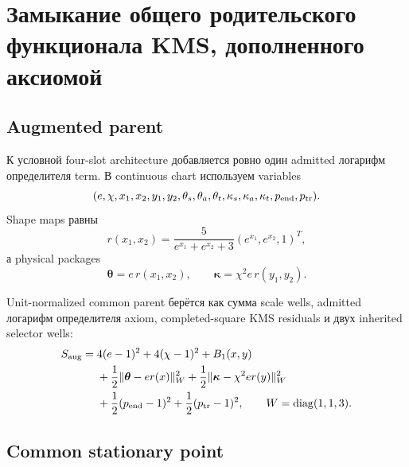 \chapter{Замыкание общего родительского функционала KMS, дополненного аксиомой}
\label{ch:v9-kms-axiom-common-closure}

\section{Augmented parent}

К условной four-slot architecture добавляется ровно один admitted логарифм определителя
term. В continuous chart используем variables
\begin{equation}
 (e,\chi,x_1,x_2,y_1,y_2,\theta_s,\theta_a,\theta_t,
 \kappa_s,\kappa_a,\kappa_t,p_{\rm end},p_{\rm tr}).
 \label{eq:v9-kms-augmented-variables}
\end{equation}
Shape maps равны
\begin{equation}
 r(x_1,x_2)=\frac5{e^{x_1}+e^{x_2}+3}(e^{x_1},e^{x_2},1)^T,
 \label{eq:v9-kms-augmented-shape}
\end{equation}
а physical packages
\begin{equation}
 \boldsymbol\theta=e\,r(x_1,x_2),
 \qquad \boldsymbol\kappa=\chi^2e\,r(y_1,y_2).
 \label{eq:v9-kms-augmented-packages}
\end{equation}

Unit-normalized common parent берётся как сумма scale wells, admitted
логарифм определителя axiom, completed-square KMS residuals и двух inherited selector wells:
\begin{equation}
 \begin{aligned}
 S_{\rm aug}={}&4(e-1)^2+4(\chi-1)^2+B_1(x,y)\\
 &+\frac12\|\boldsymbol\theta-er(x)\|_W^2
 +\frac12\|\boldsymbol\kappa-\chi^2er(y)\|_W^2\\
 &+\frac12(p_{\rm end}-1)^2+\frac12(p_{\rm tr}-1)^2,
 \qquad W=\operatorname{diag}(1,1,3).
 \end{aligned}
 \label{eq:v9-kms-augmented-parent}
\end{equation}

\section{Common stationary point}


